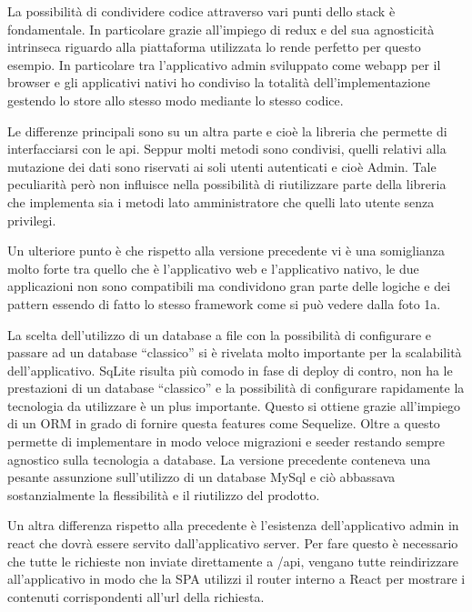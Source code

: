 La possibilità di condividere codice attraverso vari punti dello stack è fondamentale. In particolare grazie all’impiego di redux e del sua agnosticità intrinseca riguardo alla piattaforma utilizzata lo rende perfetto per questo esempio. In particolare tra l’applicativo admin sviluppato come webapp per il browser e gli applicativi nativi ho condiviso la totalità dell’implementazione gestendo lo store allo stesso modo mediante lo stesso codice. \vspace{5mm}

Le differenze principali sono su un altra parte e cioè la libreria che permette di interfacciarsi con le api. Seppur molti metodi sono condivisi, quelli relativi alla mutazione dei dati sono riservati ai soli utenti autenticati e cioè Admin. Tale peculiarità però non influisce nella possibilità di riutilizzare parte della libreria che implementa sia i metodi lato amministratore che quelli lato utente senza privilegi.\vspace{5mm} 

Un ulteriore punto è che rispetto alla versione precedente vi è una somiglianza molto forte tra quello che è l’applicativo web e l’applicativo nativo, le due applicazioni non sono compatibili ma condividono gran parte delle logiche e dei  pattern essendo di fatto lo stesso framework come si può vedere dalla foto 1a. \vspace{5mm}
	
La scelta dell’utilizzo di un database a file con la possibilità di configurare e passare ad un database “classico” si è rivelata molto importante per la scalabilità dell’applicativo. SqLite risulta più comodo in fase di deploy di contro, non ha le prestazioni di un database “classico” e la possibilità di configurare rapidamente la tecnologia da utilizzare è un plus importante. Questo si ottiene grazie all’impiego di un ORM in grado di fornire questa features come Sequelize. Oltre a questo permette di implementare in modo veloce migrazioni e seeder restando sempre agnostico sulla tecnologia a database. La versione precedente conteneva una pesante assunzione sull’utilizzo di un database MySql e ciò abbassava sostanzialmente la flessibilità e il riutilizzo del prodotto.\vspace{5mm}

Un altra differenza rispetto alla precedente è l’esistenza dell’applicativo admin in react che dovrà essere servito dall’applicativo server. Per fare questo è necessario che tutte le richieste non inviate direttamente a /api, vengano tutte reindirizzare all’applicativo in modo che la SPA utilizzi il router interno a React per mostrare i contenuti corrispondenti all’url della richiesta.\vspace{5mm}

